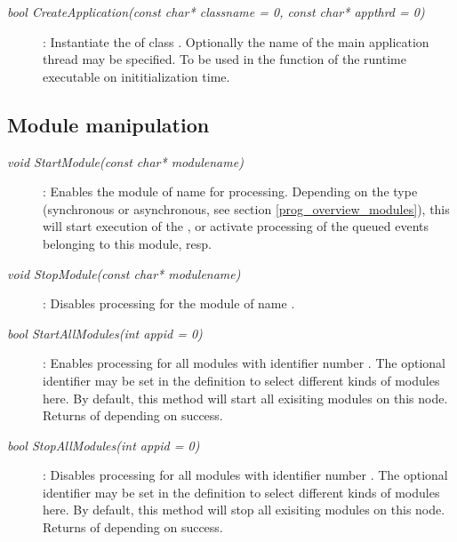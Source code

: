 \begin{description}
  
\item[\em bool CreateApplication\small (const char* classname = 0, const char* appthrd = 0)] :
Instantiate the  of class . Optionally
the name  of the main application thread may be specified.
To be used in the  function of the runtime executable on
inititialization time.

\end{description}	 


\subsection{Module manipulation}	

\begin{description}

\item[\em void StartModule\small (const char* modulename)] :
Enables the module of name  for processing.
Depending on the  type (synchronous or asynchronous,
see section \ref{prog_overview_modules}), this will start
execution of the , or activate processing of the
queued events belonging to this module, resp.

\item[\em void StopModule\small (const char* modulename)] :
Disables processing for the module of name .


\item[\em bool StartAllModules\small (int appid = 0)] :
Enables processing for all modules with identifier number .
The optional identifier  may be set in the  definition
to select different kinds of modules here. By default, this method will
start all exisiting modules on this node.
Returns  of  depending on success.

\item[\em bool StopAllModules\small (int appid = 0)] :
Disables processing for all modules with identifier number .
The optional identifier  may be set in the  definition
to select different kinds of modules here. By default, this method will
stop all exisiting modules on this node.
Returns  of  depending on success.


\end{description}
